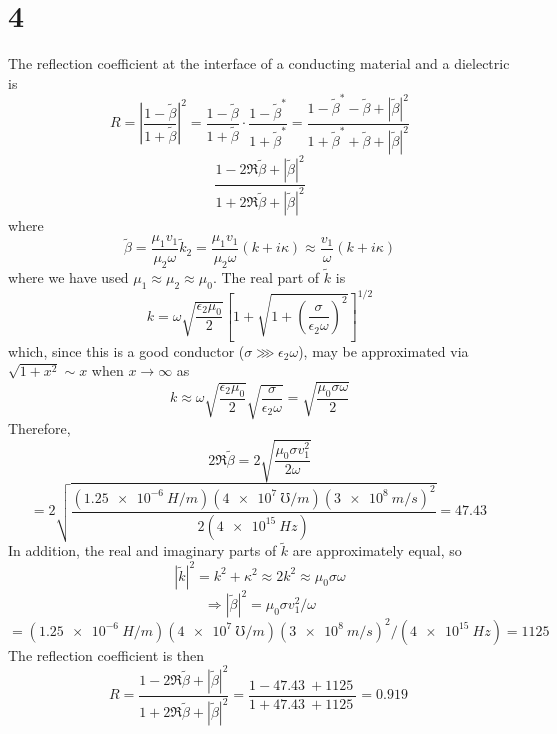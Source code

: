 \documentclass{article}
\begin{document}
\section*{4}
The reflection coefficient at the interface of a conducting material and a dielectric is
\[R=\left| \frac{1-\tilde{\beta}}{1+\tilde{\beta}}\right|^{2}=\frac{1-\tilde{\beta}}{1+\tilde{\beta}}\cdot\frac{1-\tilde{\beta}^{*}}{1+\tilde{\beta}^{*}}=\frac{1-\tilde{\beta}^{*}-\tilde{\beta}+|\tilde{\beta}|^{2}}{1+\tilde{\beta}^{*}+\tilde{\beta}+|\tilde{\beta}|^{2}}\]
\[\frac{1-2\Re{\tilde{\beta}}+|\tilde{\beta}|^{2}}{1+2\Re{\tilde{\beta}}+|\tilde{\beta}|^{2}}\]
where
\[\tilde{\beta}=\frac{\mu_{1}v_{1}}{\mu_{2}\omega}\tilde{k}_{2}=\frac{\mu_{1}v_{1}}{\mu_{2}\omega}(k+i\kappa)\approx \frac{v_{1}}{\omega}(k+i\kappa)\]
where we have used $\mu_{1}\approx\mu_{2}\approx\mu_{0}$.
The real part of $\tilde{k}$ is
\[k=\omega\sqrt{\frac{\epsilon_{2}\mu_{0}}{2}}\left[ 1+\sqrt{1+\left( \frac{\sigma}{\epsilon_{2}\omega} \right)^{2}} \right]^{1/2}\]
which, since this is a good conductor ($\sigma \ggg \epsilon_{2}\omega$), may be approximated via $\sqrt{1+x^{2}}\sim x$ when $x\to\infty$ as
\[k\approx\omega\sqrt{\frac{\epsilon_{2}\mu_{0}}{2}}\sqrt{\frac{\sigma}{\epsilon_{2}\omega}}=\sqrt{\frac{\mu_{0}\sigma\omega}{2}}\]
Therefore,
\[2\Re\tilde{\beta}=2\sqrt{\frac{\mu_{0}\sigma v_{1}^{2}}{2\omega}}\]
\[=2\sqrt{\frac{(\SI{1.25e-6}{H/m})(\SI{4e7}{\mho/m})(\SI{3e8}{m/s})^{2}}{2(\SI{4e15}{Hz})}}=\SI{47.43}{}\]
In addition, the real and imaginary parts of $\tilde{k}$ are approximately equal, so
\[|\tilde{k}|^{2}=k^{2}+\kappa^{2}\approx 2k^{2}\approx \mu_{0}\sigma\omega\]
\[\Rightarrow |\tilde{\beta}|^{2}=\mu_{0}\sigma v_{1}^{2}/\omega\]\[ =(\SI{1.25e-6}{H/m})(\SI{4e7}{\mho/m})(\SI{3e8}{m/s})^{2}/(\SI{4e15}{Hz})=\SI{1125}{}\]
The reflection coefficient is then
\[R=\frac{1-2\Re{\tilde{\beta}}+|\tilde{\beta}|^{2}}{1+2\Re{\tilde{\beta}}+|\tilde{\beta}|^{2}}=\frac{1-\SI{47.43}{}+\SI{1125}{}}{1+\SI{47.43}{}+\SI{1125}{}}
=\SI{0.919}{}\]
\end{document}
